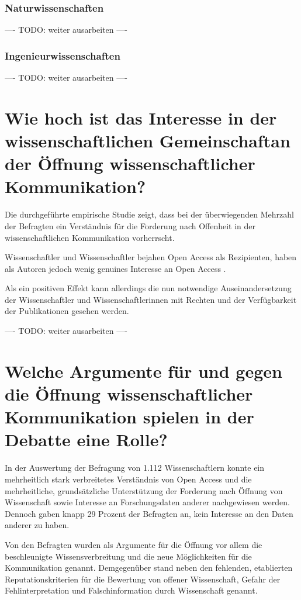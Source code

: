 \subsubsection{Naturwissenschaften}

---- TODO: weiter ausarbeiten ----

\subsubsection{Ingenieurwissenschaften}

---- TODO: weiter ausarbeiten ----

\section{Wie hoch ist das Interesse in der wissenschaftlichen Gemeinschaftan der Öffnung wissenschaftlicher Kommunikation?}

Die durchgeführte empirische Studie zeigt, dass bei der überwiegenden Mehrzahl der Befragten ein Verständnis für die Forderung nach Offenheit in der wissenschaftlichen Kommunikation vorherrscht.

Wissenschaftler und Wissenschaftler bejahen Open Access als Rezipienten, haben als Autoren jedoch wenig genuines Interesse an Open Access \cite{wein_2010_erwerbung}.

Als ein positiven Effekt kann allerdings die nun notwendige Auseinandersetzung der Wissenschaftler und Wissenschaftlerinnen mit Rechten und der Verfügbarkeit der Publikationen gesehen werden.

---- TODO: weiter ausarbeiten ----


\section{Welche Argumente für und gegen die Öffnung wissenschaftlicher Kommunikation spielen in der Debatte eine Rolle?}

In der Auswertung der Befragung von 1.112 Wissenschaftlern konnte ein mehrheitlich stark verbreitetes Verständnis von Open Access und die mehrheitliche, grundsätzliche Unterstützung der Forderung nach Öffnung von Wissenschaft sowie Interesse an Forschungsdaten anderer nachgewiesen werden. Dennoch gaben knapp 29 Prozent der Befragten an, kein Interesse an den Daten anderer zu haben.

Von den Befragten wurden als Argumente für die Öffnung vor allem die beschleunigte Wissensverbreitung und die neue Möglichkeiten für die Kommunikation genannt. Demgegenüber stand neben den fehlenden, etablierten Reputationskriterien für die Bewertung von offener Wissenschaft, Gefahr der Fehlinterpretation und Falschinformation durch Wissenschaft genannt.

